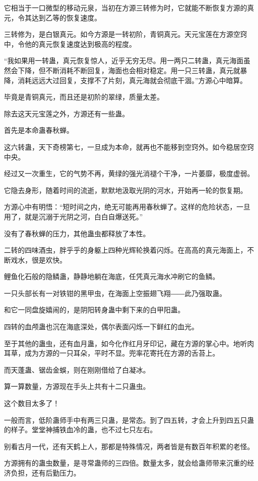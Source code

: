 \begin{this_body}
它相当于一口微型的移动元泉，当初在方源三转修为时，它就能不断恢复方源的真元，令其达到乙等的恢复速度。

三转修为，是白银真元。如今方源是一转初阶，青铜真元。天元宝莲在方源空窍中，令他的真元恢复速度达到极高的程度。

“我如果用一转蛊，真元恢复惊人，近乎无穷无尽。用一两只二转蛊，真元海面虽然会下降，但不断消耗不断回复，海面也会相对稳定。用一只三转蛊，真元就暴降，消耗远远大过回复，支撑不了片刻，真元海就会彻底干涸。”方源心中暗算。

毕竟是青铜真元，而且还是初阶的翠绿，质量太差。

除去这天元宝莲之外，方源还有一些蛊。

首先是本命蛊春秋蝉。

这六转蛊，天下奇榜第七，一旦成为本命，就再也不能移到空窍外。如今稳居空窍中央。

经过又一次重生，它的气势不再，黄绿的强光消褪个干净，一片萎靡，极度虚弱。

它隐去身形，随着时间的流逝，默默地汲取光阴的河水，开始再一轮的恢复期。

方源心中有明悟：“短时间之内，绝无可能再用春秋蝉了。这样的危险状态，一旦用了，就是沉溺于光阴之河，白白自爆送死。”

没有了春秋蝉的压力，其他蛊虫都释放了本性。

二转的四味酒虫，胖乎乎的身躯上四种光辉轮换着闪烁。在高高的真元海面上，不断戏水，很是欢快。

鲤鱼化石般的隐鳞蛊，静静地躺在海底，任凭真元海水冲刷它的鱼鳞。

一只头部长有一对铁钳的黑甲虫，在海面上空振翅飞翔――此乃强取蛊。

和它一同盘旋嬉闹的，是阴阳转身蛊中剩下来的白甲阳蛊。

四转的血颅蛊也沉在海底深处，偶尔表面闪烁一下鲜红的血光。

至于其他的蛊虫，还有血月蛊，如今化作红月牙印记，藏在方源的掌心中。地听肉耳草，成为方源的一只耳朵，平时不显。兜率花寄托在方源的舌苔上。

而天蓬蛊、锯齿金蜈，则在刚刚借给了白凝冰。

算一算数量，方源现在手头上共有十二只蛊虫。

这个数目太多了！

一般而言，低阶蛊师手中有两三只蛊，是常态。到了四五转，才会上升到四五只蛊的样子。堂堂神捕铁血冷的蛊，也不过七只左右。

别看古月一代，还有天鹤上人，那都是特殊情况，两者皆是有数百年积累的老怪。

方源拥有的蛊虫数量，是寻常蛊师的三四倍。数量太多，就会给蛊师带来沉重的经济负担，还有后勤压力。


\end{this_body}
